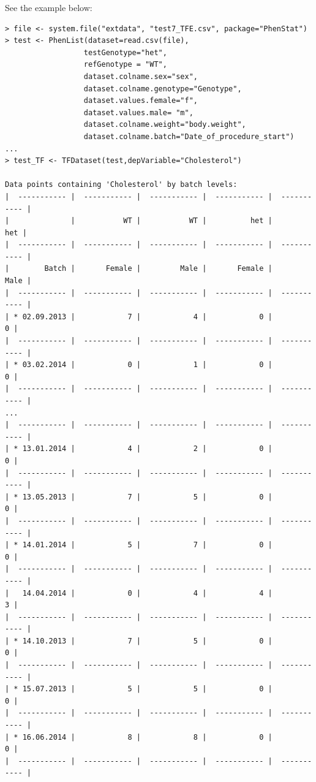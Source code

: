 \documentclass[12pt,a4paper]{article}
\begin{document}
See the example below:
\begingroup
\fontsize{8pt}{12pt}\selectfont
\begin{verbatim}
> file <- system.file("extdata", "test7_TFE.csv", package="PhenStat")
> test <- PhenList(dataset=read.csv(file),
                  testGenotype="het",
                  refGenotype = "WT",
                  dataset.colname.sex="sex",
                  dataset.colname.genotype="Genotype",
                  dataset.values.female="f",
                  dataset.values.male= "m",
                  dataset.colname.weight="body.weight",
                  dataset.colname.batch="Date_of_procedure_start")
...
> test_TF <- TFDataset(test,depVariable="Cholesterol")

Data points containing 'Cholesterol' by batch levels:
|  ----------- |  ----------- |  ----------- |  ----------- |  ----------- |
|              |           WT |           WT |          het |          het |
|  ----------- |  ----------- |  ----------- |  ----------- |  ----------- |
|        Batch |       Female |         Male |       Female |         Male |
|  ----------- |  ----------- |  ----------- |  ----------- |  ----------- |
| * 02.09.2013 |            7 |            4 |            0 |            0 |
|  ----------- |  ----------- |  ----------- |  ----------- |  ----------- |
| * 03.02.2014 |            0 |            1 |            0 |            0 |
|  ----------- |  ----------- |  ----------- |  ----------- |  ----------- |
...
|  ----------- |  ----------- |  ----------- |  ----------- |  ----------- |
| * 13.01.2014 |            4 |            2 |            0 |            0 |
|  ----------- |  ----------- |  ----------- |  ----------- |  ----------- |
| * 13.05.2013 |            7 |            5 |            0 |            0 |
|  ----------- |  ----------- |  ----------- |  ----------- |  ----------- |
| * 14.01.2014 |            5 |            7 |            0 |            0 |
|  ----------- |  ----------- |  ----------- |  ----------- |  ----------- |
|   14.04.2014 |            0 |            4 |            4 |            3 |
|  ----------- |  ----------- |  ----------- |  ----------- |  ----------- |
| * 14.10.2013 |            7 |            5 |            0 |            0 |
|  ----------- |  ----------- |  ----------- |  ----------- |  ----------- |
| * 15.07.2013 |            5 |            5 |            0 |            0 |
|  ----------- |  ----------- |  ----------- |  ----------- |  ----------- |
| * 16.06.2014 |            8 |            8 |            0 |            0 |
|  ----------- |  ----------- |  ----------- |  ----------- |  ----------- |

\end{verbatim}
\end{document}

